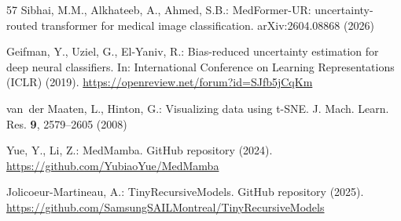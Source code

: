 \documentclass{svproc}
\begin{document}
\begin{thebibliography}{57}
Sibhai, M.M., Alkhateeb, A., Ahmed, S.B.: MedFormer-UR: uncertainty-routed transformer for medical image classification. arXiv:2604.08868 (2026)

Geifman, Y., Uziel, G., El-Yaniv, R.: Bias-reduced uncertainty estimation for deep neural classifiers. In: International Conference on Learning Representations (ICLR) (2019). \url{https://openreview.net/forum?id=SJfb5jCqKm}

van~der Maaten, L., Hinton, G.: Visualizing data using t-SNE. J. Mach. Learn. Res. \textbf{9}, 2579--2605 (2008)

Yue, Y., Li, Z.: MedMamba. GitHub repository (2024). \url{https://github.com/YubiaoYue/MedMamba}

Jolicoeur-Martineau, A.: TinyRecursiveModels. GitHub repository (2025). \url{https://github.com/SamsungSAILMontreal/TinyRecursiveModels}

\end{thebibliography}
\end{document}
